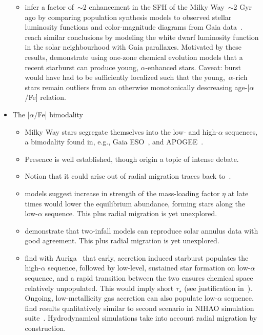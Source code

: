 \documentclass[a4paper, fleqn, usenatbib, useAMS]{mnras}
\begin{document}
\begin{itemize}
\begin{itemize}
		\item \citet{Mor2019} infer a factor of~$\sim$2 enhancement in the 
		SFH of the Milky Way~$\sim$2 Gyr ago by comparing population synthesis 
		models to observed stellar luminosity functions and color-magnitude 
		diagrams from Gaia data~\citep{GaiaDR2}.~\citet{Isern2019} reach 
		similar conclusions by modeling the white dwarf luminosity function in 
		the solar neighbourhood with Gaia parallaxes. Motivated by these 
		results, \citet{Johnson2020} demonstrate using one-zone chemical 
		evolution models that a recent starburst can produce young, 
		$\alpha$-enhanced stars. Caveat: burst would have had to be 
		sufficiently localized such that the young,~$\alpha$-rich stars remain 
		outliers from an otherwise monotonically descreasing age-[$\alpha$/Fe] 
		relation. 
	\end{itemize} 

	\item The [$\alpha$/Fe] bimodality 
	\begin{itemize} 
		\item Milky Way stars segregate themselves into the low- and 
		high-$\alpha$ sequences, a bimodality found in, e.g., 
		Gaia ESO~\citep{Recio-Blanco2014, Rojas-Arriagada2017}, and 
		APOGEE~\citep{Nidever2014, Hayden2015, Weinberg2019}. 

		\item Presence is well established, though origin a topic of intense 
		debate. 

		\item Notion that it could arise out of radial migration traces back 
		to~\citet{Schoenrich2009}. 

		\item \citet{Weinberg2017} models suggest increase in strength of the 
		mass-loading factor $\eta$ at late times would lower the equilibrium 
		abundance, forming stars along the low-$\alpha$ sequence. This plus 
		radial migration is yet unexplored. 

		\item \citet{Spitoni2019} demonstrate that two-infall models can 
		reproduce solar annulus data with good agreement. This plus 
		radial migration is yet unexplored. 

		\item \citet{Grand2018} find with Auriga~\citep{Grand2017} that early, 
		accretion induced starburst populates the high-$\alpha$ sequence, 
		followed by low-level, sustained star formation on low-$\alpha$ 
		sequence, and a rapid transition between the two ensures chemical space 
		relatively unpopulated. This would imply short $\tau_\star$ (see 
		justification in~\citealp{Weinberg2017}). Ongoing, low-metallicity 
		gas accretion can also populate low-$\alpha$ sequence.~\citet{Buck2020b} 
		find results qualitatively similar to second scenario in NIHAO 
		simulation suite~\citep{Wang2015, Buck2020a}. Hydrodynamical 
		simulations take into account radial migration by construction. 


\end{itemize}
\end{itemize}
\end{document}
